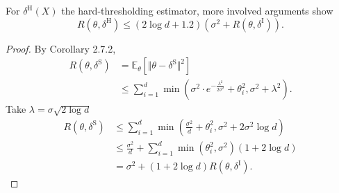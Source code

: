 \documentclass[a4paper]{article}
\begin{document}
\begin{note}
	For $\delta^{\text{H}}(X)$ the hard-thresholding estimator, more involved arguments show
	\begin{equation}
		R(\theta,\delta^{\text{H}}) \leq (2 \log d + 1.2)(\sigma^2 + R(\theta,\delta^{\text{I}})).
	\end{equation}
\end{note}

\begin{proof}
	By Corollary 2.7.2,
	\begin{equation*}
		\begin{aligned}
			R(\theta,\delta^{\text{S}}) &= \mathbb{E}_\theta[\Vert \theta - \delta^{\text{S}} \Vert^2] \\
			&\leq \sum\limits_{i=1}^d \min (\sigma^2 \cdot e^{-\frac{\lambda^2}{2\sigma^2}} + \theta_i^2, \sigma^2 + \lambda^2).
		\end{aligned}
	\end{equation*}
	Take $\lambda = \sigma\sqrt{2\log d}$
	\begin{equation}
		\begin{aligned}
			R(\theta,\delta^{\text{S}}) &\leq \sum\limits_{i=1}^d \min (\frac{\sigma^2}{d} + \theta_i^2, \sigma^2 + 2\sigma^2\log d) \\
			&\leq \frac{\sigma^2}{d} + \sum\limits_{i=1}^d \min(\theta_i^2,\sigma^2)(1 + 2 \log d) \\
			&= \sigma^2 + (1 + 2 \log d) R(\theta,\delta^{\text{I}}).
		\end{aligned}
	\end{equation}
\end{proof}
\end{document}
